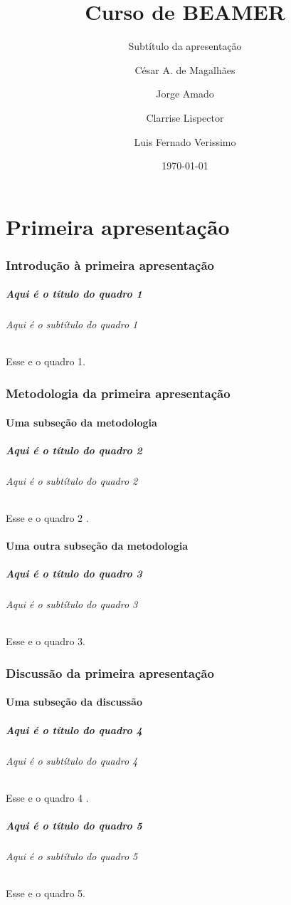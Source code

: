 \documentclass[aspectratio=169]{beamer}
\title{Curso de BEAMER}
\subtitle{Subtítulo da apresentação}
\author[César \and Jorge \and Clarrise \and Luis]{César A. de Magalhães \and Jorge Amado \and Clarrise Lispector \and Luis Fernado Verissimo}
\institute[UNOPAR]{Universidade do Norte do Paraná \\ https://vestibular.unoparead.com.br}
\date{\today}
\begin{document}
	\begin{frame}
		\titlepage
	\end{frame}
			
	\part{Primeira apresentação}
		\section[Introdução]{Introdução à primeira apresentação}
			\begin{frame}
				\frametitle{Aqui é o título do quadro 1}
				\framesubtitle{Aqui é o subtítulo do quadro 1}
				Esse e o quadro 1.
			\end{frame}	
		
		\section[Metodologia]{Metodologia da primeira apresentação}
			\subsection{Uma subseção da metodologia}
				\begin{frame}
					\frametitle{Aqui é o título do quadro 2}
					\framesubtitle{Aqui é o subtítulo do quadro 2}
					Esse e o quadro 2 \cite{meuartigo}.
				\end{frame}	
			
			\subsection{Uma outra subseção da metodologia}
				\begin{frame}
					\frametitle{Aqui é o título do quadro 3}
					\framesubtitle{Aqui é o subtítulo do quadro 3}
					Esse e o quadro 3.
				\end{frame}	
		
		\section[Discussão]{Discussão da primeira apresentação}
			\subsection{Uma subseção da discussão}
				\begin{frame}
					\frametitle{Aqui é o título do quadro 4}
					\framesubtitle{Aqui é o subtítulo do quadro 4}
					Esse e o quadro 4 \cite{meulivro}.
				\end{frame}
				\begin{frame}
					\frametitle{Aqui é o título do quadro 5}
					\framesubtitle{Aqui é o subtítulo do quadro 5}
					Esse e o quadro 5.
				\end{frame}
			
\end{document}
